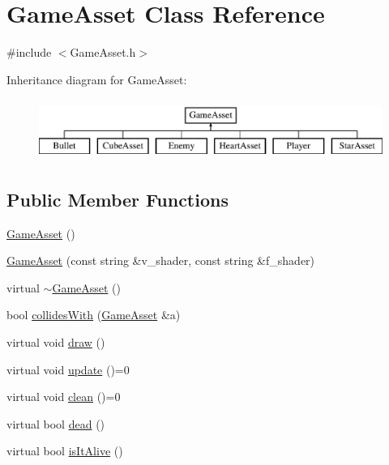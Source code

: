 \hypertarget{classGameAsset}{\section{Game\-Asset Class Reference}
\label{classGameAsset}
}


{\ttfamily \#include $<$Game\-Asset.\-h$>$}

Inheritance diagram for Game\-Asset\-:\begin{figure}[H]
\begin{center}
\leavevmode
\includegraphics[height=2.000000cm]{classGameAsset}
\end{center}
\end{figure}
\subsection*{Public Member Functions}
\begin{DoxyCompactItemize}
\item 
\hyperlink{classGameAsset_a9c96b0bafa2b6973a2e8c09bf51c52ec}{Game\-Asset} ()
\item 
\hyperlink{classGameAsset_ac6d2340f41dd95e71892327dae4e1585}{Game\-Asset} (const string \&v\-\_\-shader, const string \&f\-\_\-shader)
\item 
virtual \hyperlink{classGameAsset_ace6e367e781c48c6847812778107fcbf}{$\sim$\-Game\-Asset} ()
\item 
bool \hyperlink{classGameAsset_a612793ce2a354d2f8839a779d0ca2227}{collides\-With} (\hyperlink{classGameAsset}{Game\-Asset} \&a)
\item 
virtual void \hyperlink{classGameAsset_a2d7e18a8f1dd8ba89ed1bd14f2affeab}{draw} ()
\item 
virtual void \hyperlink{classGameAsset_a42688ec8f02e201eaaa01e74a112083f}{update} ()=0
\item 
virtual void \hyperlink{classGameAsset_abbea962eaa63a813949b834778b7483e}{clean} ()=0
\item 
virtual bool \hyperlink{classGameAsset_a631982e6d36061c08c7e8981ce0fd308}{dead} ()
\item 
virtual bool \hyperlink{classGameAsset_a3b5885fc74b95141312d6e6d60d0a9d3}{is\-It\-Alive} ()
\end{DoxyCompactItemize}
